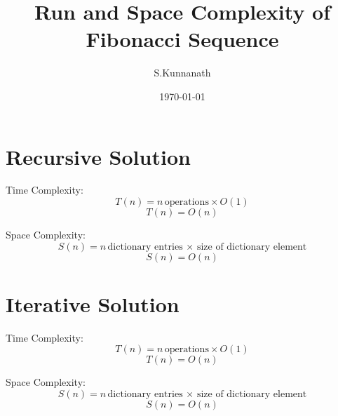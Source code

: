 \documentclass{article}
\title{Run and Space Complexity of Fibonacci Sequence}
\author{S.Kunnanath}
\date{\today}
\begin{document}
\maketitle

\section{Recursive Solution}
\begin{flushleft}
    
Time Complexity:
\[T(n) = n \, \textrm{operations} \times  O(1) \]
\[T(n) = O(n) \]

Space Complexity:
\[S(n) = n \, \textrm{dictionary entries} \, \times \, \textrm{size of dictionary element} \]
\[S(n) = O(n) \]

\section{Iterative Solution}

Time Complexity:
\[T(n) = n \, \textrm{operations} \times  O(1) \]
\[T(n) = O(n) \]

Space Complexity:
\[S(n) = n \, \textrm{dictionary entries} \, \times \, \textrm{size of dictionary element} \]
\[S(n) = O(n) \]

\end{flushleft}
\end{document}
